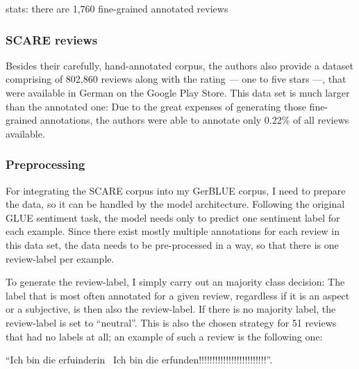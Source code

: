 stats: there are 1,760 fine-grained annotated reviews

\subsubsection{SCARE reviews}

Besides their carefully, hand-annotated corpus, the authors also provide a dataset comprising of
802,860 reviews along with the rating --- one to five stars ---, that were available in German on
the Google Play Store.
This data set is much larger than the annotated one: Due to the great expenses of generating those
fine-grained annotations, the authors were able to annotate only 0.22\% of all reviews available.

\subsubsection{Preprocessing}

For integrating the SCARE corpus into my GerBLUE corpus, I need to prepare the data, so it can be
handled by the model architecture.
Following the original GLUE sentiment task, the model needs only to predict one sentiment label
for each example.
Since there exist mostly multiple annotations for each review in this data set, the data needs to
be pre-processed in a way, so that there is one review-label per example.

To generate the review-label, I simply carry out an majority class decision:
The label that is most often annotated for a given review, regardless if it is an aspect or a
subjective, is then also the review-label.
If there is no majority label, the review-label is set to ``neutral''.
This is also the chosen strategy for 51 reviews that had no labels at all; an example of such a
review is the following one:

\begin{examples}
  \item ``Ich bin die erfuinderin \textbar \textbar\ Ich bin die erfunden!!!!!!!!!!!!!!!!!!!!!!!!!''.
\end{examples}


